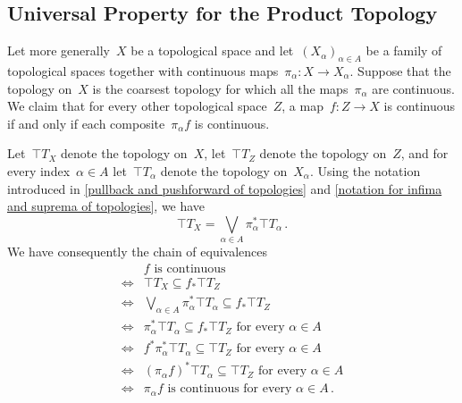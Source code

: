 \subsection{Universal Property for the Product Topology}

Let more generally~$X$ be a topological space and let~$(X_α)_{α ∈ A}$ be a family of topological spaces together with continuous maps~$π_α \colon X \to X_α$.
Suppose that the topology on~$X$ is the coarsest topology for which all the maps~$π_α$ are continuous.
We claim that for every other topological space~$Z$, a map~$f \colon Z \to X$ is continuous if and only if each composite~$π_α f$ is continuous.

Let~$\top{T}_X$ denote the topology on~$X$, let~$\top{T}_Z$ denote the topology on~$Z$, and for every index~$α ∈ A$ let~$\top{T}_α$ denote the topology on~$X_α$.
Using the notation introduced in \cref{pullback and pushforward of topologies} and \cref{notation for infima and suprema of topologies}, we have
\[
	\top{T}_X = ⋁_{α ∈ A} π_α^* \top{T}_α \,.
\]
We have consequently the chain of equivalences
\begin{align*}
	{}&
	\text{$f$ is continuous} \\
	\iff{}&
	\top{T}_X ⊆ f_* \top{T}_Z \\
	\iff{}&
	\textstyle ⋁_{α ∈ A} π_α^* \top{T}_α ⊆ f_* \top{T}_Z \\
	\iff{}&
	\text{$π_α^* \top{T}_α ⊆ f_* \top{T}_Z$ for every~$α ∈ A$} \\
	\iff{}&
	\text{$f^* π_α^* \top{T}_α ⊆ \top{T}_Z$ for every~$α ∈ A$} \\
	\iff{}&
	\text{$(π_α f)^* \top{T}_α ⊆ \top{T}_Z$ for every~$α ∈ A$} \\
	\iff{}&
	\text{$π_α f$ is continuous for every~$α ∈ A$} \,.
\end{align*}
